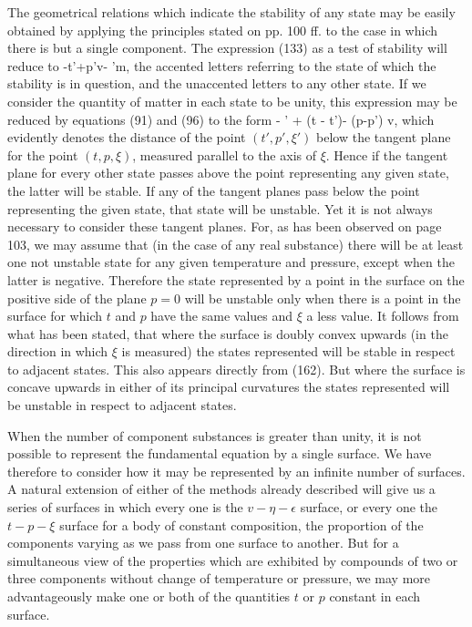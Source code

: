 \documentclass[12pt]{memoir}
\begin{document}
The geometrical relations which indicate the stability of any state may be easily obtained by applying the principles stated on pp. 100 ff. to the case in which there is but a single component. The expression (133) as a test of stability will reduce to
\eqs \epsilon-t'\eta+p'v- \mu'm, \label{197}\eqe
the accented letters referring to the state of which the stability is in question, and the unaccented letters to any other state. If we consider the quantity of matter in each state to be unity, this expression may be reduced by equations (91) and (96) to the form
\eqs \xi- \xi' + (t - t')\eta - (p-p') v, \label{198}\eqe
which evidently denotes the distance of the point $(t', p', \xi')$ below the tangent plane for the point $(t, p, \xi)$, measured parallel to the axis of $\xi$. Hence if the tangent plane for every other state passes above the point representing any given state, the latter will be stable. If any of the tangent planes pass below the point representing the given state, that state will be unstable. Yet it is not always necessary to consider these tangent planes. For, as has been observed on page 103, we may assume that (in the case of any real substance) there will be at least one not unstable state for any given temperature and pressure, except when the latter is negative. Therefore the state represented by a point in the surface on the positive side of the plane $p =0$ will be unstable only when there is a point in the surface for which $t$ and $p$ have the same values and $\xi$ a less value. It follows from what has been stated, that where the surface is doubly convex upwards (in the direction in which $\xi$ is measured) the states represented will be stable in respect to adjacent states. This also appears directly from (162). But where the surface is concave upwards in either of its principal curvatures the states represented will be unstable in respect to adjacent states.


When the number of component substances is greater than unity, it is not possible to represent the fundamental equation by a single surface. We have therefore to consider how it may be represented by an infinite number of surfaces. A natural extension of either of the methods already described will give us a series of surfaces in which every one is the $v\!- \eta\!-\epsilon$ surface, or every one the $t\!-p\!-\xi$ surface for a body of constant composition, the proportion of the components varying as we pass from one surface to another. But for a simultaneous view of the properties which are exhibited by compounds of two or three components without change of temperature or pressure, we may more advantageously make one or both of the quantities $t$ or $p$ constant in each surface.
\end{document}
